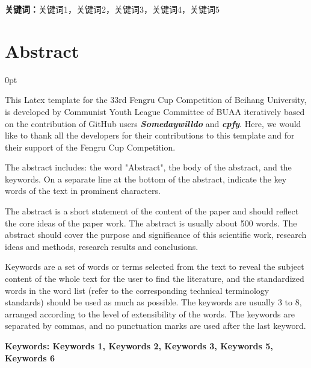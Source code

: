 \documentclass[zihao=-4]{ctexart}
\newcommand{\setParDis}{\setlength {\parskip} {0pt} }
\begin{document}
\textbf{关键词：}关键词1，关键词2，关键词3，关键词4，关键词5

\newpage
\section*{\textbf{Abstract}} %
\begin{spacing}{1.5}
\begin{adjustwidth}{0.42cm}{0.42cm}
  \setParDis %

\qquad This Latex template for the 33rd Fengru Cup Competition of 
Beihang University, is developed by Communist Youth League Committee of BUAA 
iteratively based on the contribution of GitHub 
users \textbf{\textit{Somedaywilldo}} and \textbf{\textit{cpfy}}. 
Here, we would like to thank all the developers for their 
contributions to this template and for their support of the Fengru Cup Competition.

The abstract includes: the word "Abstract", the body of the abstract, and the keywords. On a separate line at the bottom of the abstract, indicate the key words of the text in prominent characters.

The abstract is a short statement of the content of the paper and should reflect the core ideas of the paper work. The abstract is usually about 500 words. The abstract should cover the purpose and significance of this scientific work, research ideas and methods, research results and conclusions.

Keywords are a set of words or terms selected from the text to reveal the subject content of the whole text for the user to find the literature, and the standardized words in the word list (refer to the corresponding technical terminology standards) should be used as much as possible. The keywords are usually 3 to 8, arranged according to the level of extensibility of the words. The keywords are separated by commas, and no punctuation marks are used after the last keyword.

\textbf{Keywords: Keywords 1, Keywords 2, Keywords 3, Keywords 5, Keywords 6}
\end{adjustwidth}
\end{spacing}





\clearpage
\tableofcontents
\clearpage
\end{document}
